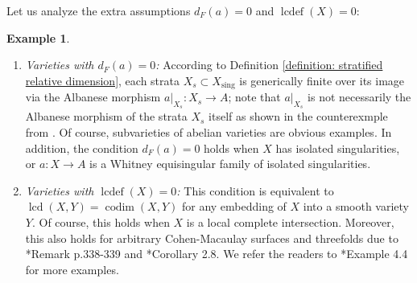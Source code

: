 \documentclass[11pt]{amsart}
\theoremstyle{definition}
\newtheorem{example}[equation]{Example}
\theoremstyle{plain}
\DeclareMathOperator{\sing}{sing}
\DeclareMathOperator{\lcd}{lcd}
\DeclareMathOperator{\codim}{codim}
\DeclareMathOperator{\lcdef}{lcdef}
\begin{document}
Let us analyze the extra assumptions $d_F(a) = 0$ and $\lcdef(X) = 0$:

\begin{example}
    \begin{enumerate}
        \item \textit{Varieties with $d_F(a) = 0$:} According to Definition \ref{definition: stratified relative dimension}, each strata $X_s \subset X_{\sing}$ is generically finite over its image via the Albanese morphism $a|_{X_s}:X_s\to A$; note that $a|_{X_s}$ is not necessarily the Albanese morphism of the strata $X_s$ itself as shown in the counterexmple from \cite{Hacon-counter_eg_for_GV}. Of course, subvarieties of abelian varieties are obvious examples. In addition, the condition $d_F(a) = 0$ holds when $X$ has isolated singularities, or $a:X \to A$ is a Whitney equisingular family of isolated singularities. 

        \item \textit{Varieties with $\lcdef(X) = 0$:} This condition is equivalent to $\lcd(X,Y) = \codim(X, Y)$ for any embedding of $X$ into a smooth variety $Y$. Of course, this holds when $X$ is a local complete intersection. Moreover, this also holds for arbitrary Cohen-Macaulay surfaces and threefolds due to \cite{Ogus-lcd}*{Remark p.338-339} and \cite{dao-takagi_lcdef_bound}*{Corollary 2.8}. We refer the readers to \cite{DB-injectivity}*{Example 4.4} for more examples. 
    \end{enumerate}
\end{example}



\end{document}

